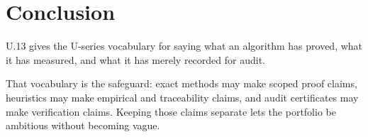 \section{Conclusion}

U.13 gives the U-series vocabulary for saying what an algorithm has proved,
what it has measured, and what it has merely recorded for audit.

That vocabulary is the safeguard: exact methods may make scoped proof claims,
heuristics may make empirical and traceability claims, and audit certificates
may make verification claims. Keeping those claims separate lets the portfolio
be ambitious without becoming vague.
